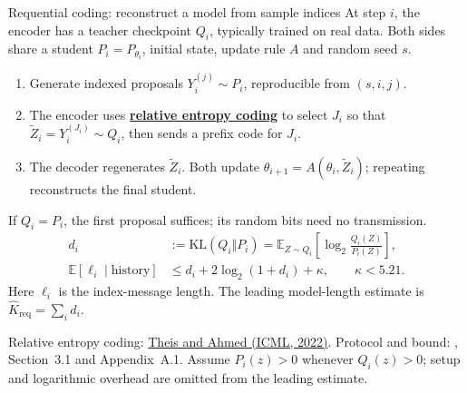 \documentclass[aspectratio=169,notheorems]{beamer}
\theoremstyle{definition}
\newcommand{\E}{\mathbb{E}}
\newcommand{\KL}{\mathrm{KL}}
\newcommand{\src}[1]{{\scriptsize\color{black!60}#1\par}}
\begin{document}
\begin{frame}{Requential coding: reconstruct a model from sample indices}
\small
At step $i$, the encoder has a teacher checkpoint $Q_i$, typically trained on real data. Both sides share a student $P_i=P_{\theta_i}$, initial state, update rule $A$ and random seed $s$.
\begin{enumerate}\setlength{\itemsep}{0.45em}
\item Generate indexed proposals $Y_i^{(j)}\sim P_i$, reproducible from $(s,i,j)$.
\item The encoder uses \href{https://proceedings.mlr.press/v162/theis22a.html}{\textbf{relative entropy coding}} to select $J_i$ so that $\widetilde Z_i=Y_i^{(J_i)}\sim Q_i$, then sends a prefix code for $J_i$.
\item The decoder regenerates $\widetilde Z_i$. Both update $\theta_{i+1}=A(\theta_i,\widetilde Z_i)$; repeating reconstructs the final student.
\end{enumerate}
If $Q_i=P_i$, the first proposal suffices; its random bits need no transmission.
\[
\begin{aligned}
d_i&:=\KL(Q_i\Vert P_i)=\E_{Z\sim Q_i}\!\left[\log_2\frac{Q_i(Z)}{P_i(Z)}\right],\\
\E[\ell_i\mid\text{history}]&\le d_i+2\log_2(1+d_i)+\kappa,\qquad\kappa<5.21.
\end{aligned}
\]
Here $\ell_i$ is the index-message length. The leading model-length estimate is $\widehat K_{\mathrm{req}}=\sum_i d_i$.
\par\smallskip
\src{Relative entropy coding: \href{https://proceedings.mlr.press/v162/theis22a.html}{Theis and Ahmed (ICML, 2022)}. Protocol and bound: \citet{qiu2026}, Section~3.1 and Appendix~A.1. Assume $P_i(z)>0$ whenever $Q_i(z)>0$; setup and logarithmic overhead are omitted from the leading estimate.}
\end{frame}
\end{document}
